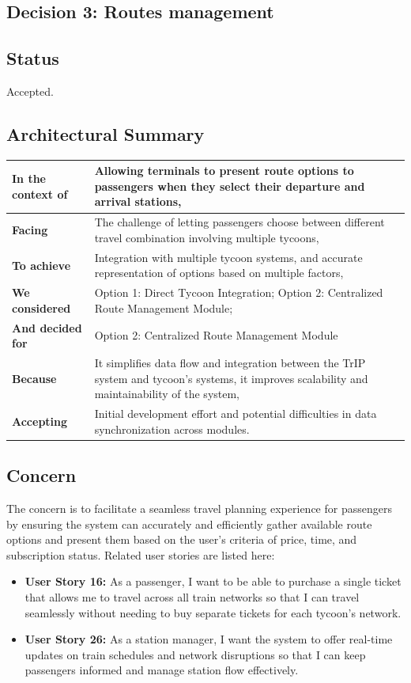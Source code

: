 \subsection{Decision 3: Routes management}

\subsection*{Status}
Accepted.

\subsection*{Architectural Summary}
\begin{tabular}{|p{3.5cm}|p{10.5cm}|}
    \hline
    \textbf{In the context of} & Allowing terminals to present route options to passengers when they select their departure and arrival stations, \\
    \hline
    \textbf{Facing} & The challenge of letting passengers choose between different travel combination involving multiple tycoons, \\
    \hline
    \textbf{To achieve} & Integration with multiple tycoon systems, and accurate representation of options based on multiple factors, \\
    \hline
    \textbf{We considered} & Option 1: Direct Tycoon Integration; Option 2: Centralized Route Management Module; \\
    \hline
    \textbf{And decided for} & Option 2: Centralized Route Management Module \\
    \hline
    \textbf{Because} & It simplifies data flow and integration between the TrIP system and tycoon's systems, it improves scalability and maintainability of the system, \\
    \hline
    \textbf{Accepting} & Initial development effort and potential difficulties in data synchronization across modules. \\
    \hline
\end{tabular}

\subsection*{Concern}
The concern is to facilitate a seamless travel planning experience for passengers by ensuring the system can accurately and efficiently gather available route options and present them based on the user's criteria of price, time, and subscription status.
Related user stories are listed here:
\begin{itemize}
    \item \textbf{User Story 16:} As a passenger, I want to be able to purchase a single ticket that allows me to travel across all train networks so that I can travel seamlessly without needing to buy separate tickets for each tycoon's network.
    \item \textbf{User Story 26:} As a station manager, I want the system to offer real-time updates on train schedules and network disruptions so that I can keep passengers informed and manage station flow effectively.
\end{itemize}

